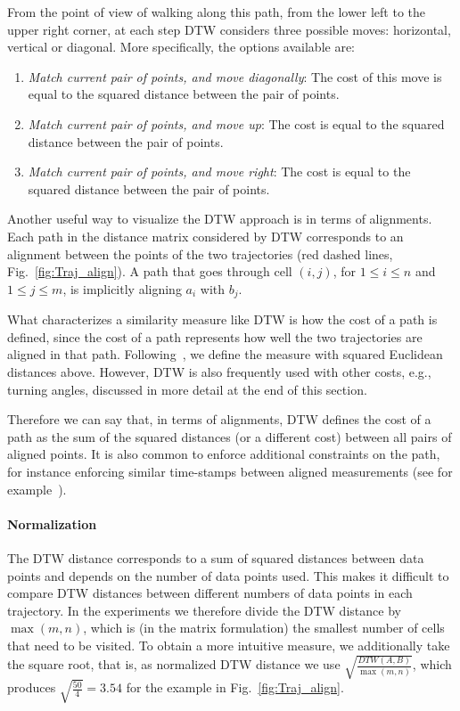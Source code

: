 \documentclass[10pt,letterpaper]{article}
\begin{document}
From the point of view of walking along this path, from the lower left to the upper right corner, at each step DTW considers three possible moves: horizontal, vertical or diagonal.  More specifically, the options available are:
\begin{enumerate}
\item \textit{Match current pair of points, and move diagonally}: The cost of this move is equal to the squared distance between the pair of points.
\item \textit{Match current pair of points, and move up}: The cost is equal to the squared distance between the pair of points.
\item \textit{Match current pair of points, and move right}: The cost is equal to the squared distance between the pair of points.
\end{enumerate}

Another useful way to visualize the DTW approach is in terms of alignments. Each path in the distance matrix considered by DTW corresponds to an alignment between the points of the two trajectories (red dashed lines, Fig.~\ref{fig:Traj_align}). A path that goes through cell $(i,j)$, for $1 \leq i \leq n$ and $1 \leq j \leq m$, is implicitly aligning $a_i$ with $b_j$. 



What characterizes a similarity measure like DTW is how the cost of a path is defined, since the cost of a path represents how well the two trajectories are aligned in that path.  Following~\cite{ChenOO05}, we define the measure with squared Euclidean distances above. However, DTW is also frequently used with other costs, e.g., turning angles, discussed in more detail at the end of this section.

Therefore we can say that, in terms of alignments, DTW defines the cost of a path as the sum of the squared distances (or a different cost) between all pairs of aligned points. It is also common to enforce additional constraints on the path, for instance enforcing similar time-stamps between aligned measurements (see for example~\cite{keogh2005exact}).

\paragraph{Normalization}
The DTW distance corresponds to a sum of squared distances between data points and depends on the number of data points used. This makes it difficult to compare DTW distances between different numbers of data points in each trajectory. In the experiments we therefore divide the DTW distance by $\max (m,n)$, which is (in the matrix formulation) the smallest number of cells that need to be visited. To obtain a more intuitive measure, we additionally take the square root, that is, as normalized DTW distance we use $\sqrt{\frac{DTW(A, B)}{\max (m,n)}}$, which produces $\sqrt{\frac{50}{4}}=3.54$ for the example in Fig.~\ref{fig:Traj_align}.
\end{document}
